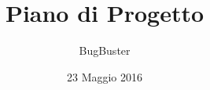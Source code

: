 




\title{\textbf{Piano di Progetto}}
\author{BugBuster}

\date{23 Maggio 2016}




\makeFrontPage

\tableofcontents





